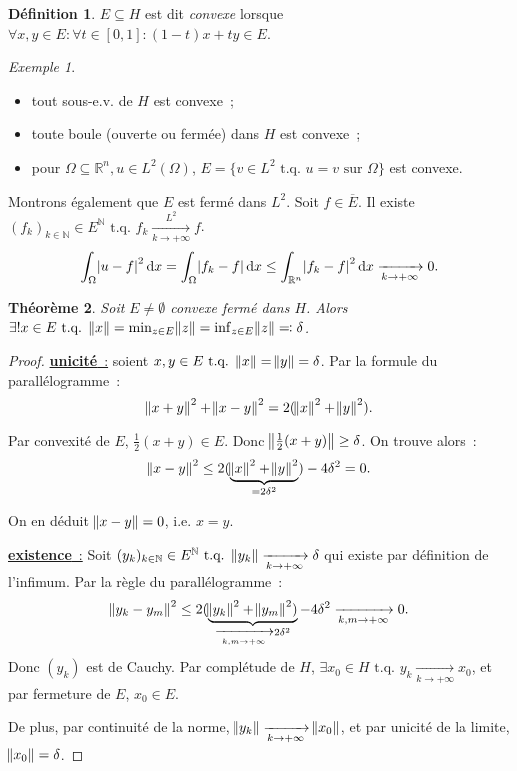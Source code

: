 \documentclass{report}
\newcommand{\R}{{\mathbb R}}
\newcommand{\N}{{\mathbb N}}
\newcommand{\tq}{\text{ t.q. }}
\newcommand{\pinfty}{{+\infty}}
\newcommand{\dx}{\dif x}
\newcommand{\unic}{{\underline {\textbf{unicité}~:}} }
\newcommand{\exis}{{\underline {\textbf{existence}~:}} }
\newtheorem{thm}{Théorème}[chapter]
\theoremstyle{definition}
\newtheorem{déf}[thm]{Définition}
\theoremstyle{remark}
\newtheorem{ex}{Exemple}[chapter]
\begin{document}
\begin{déf} $E \subseteq H$ est dit \textit{convexe} lorsque $\forall x, y \in E : \forall t \in [0, 1] : (1-t)x + ty \in E$.
\end{déf}

\begin{ex}~
\begin{itemize}
	\item tout sous-e.v. de $H$ est convexe~;
	\item toute boule (ouverte ou fermée) dans $H$ est convexe~;
	\item pour $\Omega \subseteq \R^n, u \in L^2(\Omega)$, $E = \{v \in L^2 \tq u=v \text{ sur } \Omega\}$ est convexe.
\end{itemize}

Montrons également que $E$ est fermé dans $L^2$. Soit $f \in \overline E$. Il existe $(f_k)_{k \in \N} \in E^\N \tq f_k \xrightarrow[k \to \pinfty]{L^2} f$.
\[\int_\Omega \abs {u-f}^2\dx = \int_\Omega\abs {f_k-f}\dif x \leq \int_{\R^n}\abs {f_k-f}^2\dx \xrightarrow[k \to \pinfty]{} 0.\]
\end{ex}

\begin{thm} Soit $E \neq \emptyset$ convexe fermé dans $H$. Alors $\exists! x \in E \tq \norm x = \min_{z \in E}\norm z = \inf_{z \in E}\norm z \eqqcolon \delta$.
\end{thm}

\begin{proof} \unic soient $x, y \in E \tq \norm x = \norm y = \delta$. Par la formule du parallélogramme~:
\[\norm {x+y}^2 + \norm {x-y}^2 = 2(\norm x^2+\norm y^2).\]

Par convexité de $E$, $\frac 12(x+y) \in E$. Donc $\norm {\frac 12(x+y)} \geq \delta$. On trouve alors~:
\[\norm {x-y}^2 \leq 2(\underbrace {\norm x^2 + \norm y^2}_{=2\delta^2}) - 4\delta^2 = 0.\]

On en déduit $\norm {x-y} = 0$, i.e. $x=y$.

\exis Soit $(y_k)_{k \in \N} \in E^\N \tq \norm {y_k} \xrightarrow[k \to \pinfty]{} \delta$ qui existe par définition de l'infimum. Par la règle du parallélogramme~:
\[\norm {y_k - y_m}^2 \leq 2(\underbrace {\norm {y_k}^2+\norm {y_m}^2)}_{\xrightarrow[k, m \to \pinfty]{} 2\delta^2} - 4\delta^2 \xrightarrow[k, m \to \pinfty]{} 0.\]
Donc $(y_k)$ est de Cauchy. Par complétude de $H$, $\exists x_0 \in H \tq y_k \xrightarrow[k \to \pinfty]{} x_0$, et par fermeture de $E$, $x_0 \in E$.

De plus, par continuité de la norme, $\norm {y_k} \xrightarrow[k \to \pinfty]{} \norm {x_0}$, et par unicité de la limite, $\norm {x_0} = \delta$.
\end{proof}
\end{document}
